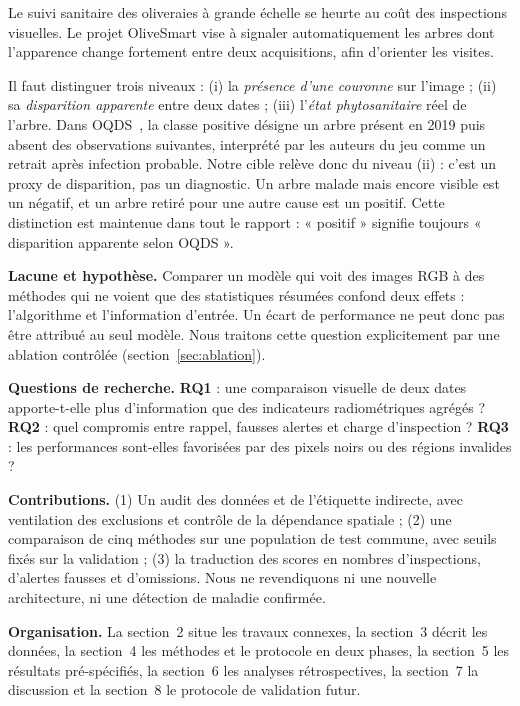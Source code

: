 \documentclass[10pt,a4paper,twocolumn]{article}
\makeatletter
\renewcommand\section{\@startsection{section}{1}{\z@}{-1.6ex plus -.4ex}{0.7ex}{\normalfont\large\bfseries\color{olive}}}
\makeatother
\begin{document}
\section{Introduction}
Le suivi sanitaire des oliveraies à grande échelle se heurte au coût des inspections visuelles. Le projet OliveSmart vise à
signaler automatiquement les arbres dont l'apparence change fortement entre deux acquisitions, afin d'orienter les visites.

Il faut distinguer trois niveaux : (i) la \emph{présence d'une couronne} sur l'image ; (ii) sa \emph{disparition apparente}
entre deux dates ; (iii) l'\emph{état phytosanitaire} réel de l'arbre. Dans OQDS~\cite{oqds}, la classe positive désigne un arbre
présent en 2019 puis absent des observations suivantes, interprété par les auteurs du jeu comme un retrait après infection
probable. Notre cible relève donc du niveau (ii) : c'est un proxy de disparition, pas un diagnostic. Un arbre malade mais encore
visible est un négatif, et un arbre retiré pour une autre cause est un positif. Cette distinction est maintenue dans tout le
rapport : « positif » signifie toujours « disparition apparente selon OQDS ».

\textbf{Lacune et hypothèse.} Comparer un modèle qui voit des images RGB à des méthodes qui ne voient que des statistiques
résumées confond deux effets : l'algorithme et l'information d'entrée. Un écart de performance ne peut donc pas être attribué
au seul modèle. Nous traitons cette question explicitement par une ablation contrôlée (section~\ref{sec:ablation}).

\textbf{Questions de recherche.} \textbf{RQ1} : une comparaison visuelle de deux dates apporte-t-elle plus d'information que des
indicateurs radiométriques agrégés ? \textbf{RQ2} : quel compromis entre rappel, fausses alertes et charge d'inspection ?
\textbf{RQ3} : les performances sont-elles favorisées par des pixels noirs ou des régions invalides ?

\textbf{Contributions.} (1) Un audit des données et de l'étiquette indirecte, avec ventilation des exclusions et contrôle de la
dépendance spatiale ; (2) une comparaison de cinq méthodes sur une population de test commune, avec seuils fixés sur la
validation ; (3) la traduction des scores en nombres d'inspections, d'alertes fausses et d'omissions. Nous ne revendiquons ni une
nouvelle architecture, ni une détection de maladie confirmée.

\textbf{Organisation.} La section~2 situe les travaux connexes, la section~3 décrit les données, la section~4 les méthodes et le
protocole en deux phases, la section~5 les résultats pré-spécifiés, la section~6 les analyses rétrospectives, la section~7 la
discussion et la section~8 le protocole de validation futur.
\end{document}
